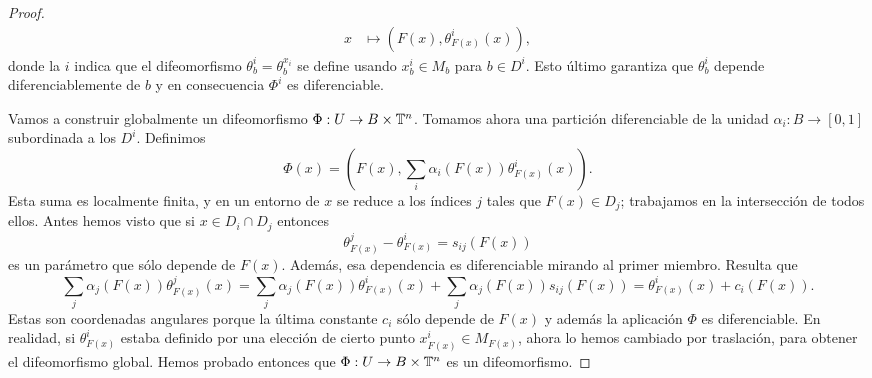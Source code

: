 \begin{proof}
\begin{align*}
	 x &\longmapsto (F(x),\theta^i_{F(x)}(x)),
	 \end{align*}
	 donde la $i$ indica que el difeomorfismo $\theta^i_b=\theta^{x_i}_b$ se define usando $x^i_b\in M_b$ para $b\in D^i$. Esto último garantiza que $\theta^i_b$ depende diferenciablemente de $b$ y en consecuencia $\Phi^i$ es diferenciable. 
	 \begin{center}
	 \end{center}
	 
	 Vamos a construir globalmente un difeomorfismo $\Phi:U\rightarrow B\times \mathbb{T}^n$. Tomamos ahora  una partición diferenciable de la unidad $\alpha_i:B\rightarrow [0,1]$ subordinada a los $D^i$. Definimos
	 \begin{equation*}
	   \Phi(x)=\left( F(x),\sum_i\alpha_i(F(x))\theta^i_{F(x)}(x) \right).
	 \end{equation*}
	 Esta suma es localmente finita, y en un entorno de $x$ se reduce a los índices $j$ tales que $F(x)\in D_j$; trabajamos en la intersección de todos ellos. Antes hemos visto que si $x\in D_i \cap D_j$ entonces 
	 \begin{equation*}
	   \theta^j_{F(x)}-\theta^i_{F(x)}=s_{ij}(F(x))
	 \end{equation*}
	 es un parámetro que sólo depende de $F(x)$. Además, esa dependencia es diferenciable mirando al primer miembro. Resulta que
	 \begin{equation*}
	   \sum_j \alpha_j(F(x))\theta^j_{F(x)}(x)=\sum_j \alpha_j(F(x))\theta^i_{F(x)}(x)+\sum_j \alpha_j(F(x))s_{ij}(F(x))=\theta^i_{F(x)}(x)+c_i(F(x)).
	 \end{equation*}
	 Estas son coordenadas angulares porque la última constante $c_i$ sólo depende de $F(x)$ y además la aplicación $\Phi$ es diferenciable. En realidad, si $\theta^i_{F(x)}$ estaba definido por una elección de cierto punto $x^i_{F(x)}\in M_{F(x)}$, ahora lo hemos cambiado por traslación, para obtener el difeomorfismo global. Hemos probado entonces que $\Phi:U\rightarrow B\times \mathbb{T}^n$ es un difeomorfismo.
	 


\end{proof}
